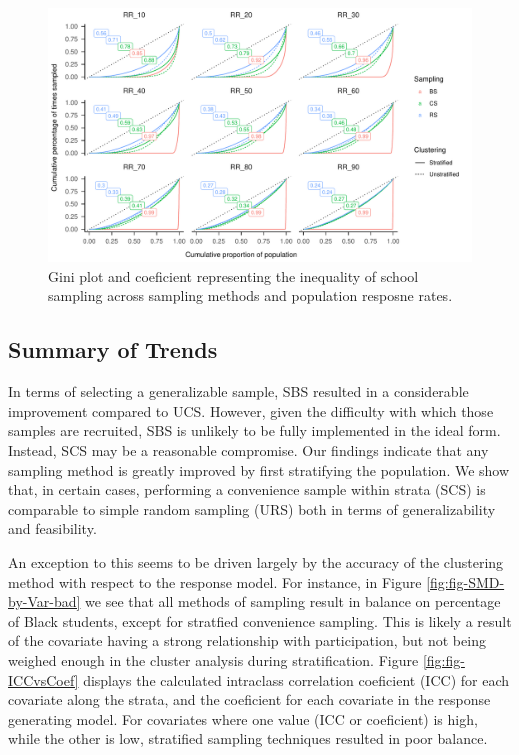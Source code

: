 \documentclass[man,floatsintext]{apa6}
\begin{document}
\begin{figure}
\includegraphics{GenSamp-Paper_files/figure-latex/fig-gini-curve-1} \caption{Gini plot and coeficient representing the inequality of school sampling across sampling methods and population resposne rates.}\label{fig:fig-gini-curve}
\end{figure}

\hypertarget{summary-of-trends}{%
\subsection{Summary of Trends}\label{summary-of-trends}}

In terms of selecting a generalizable sample, SBS resulted in a considerable improvement compared to UCS. However, given the difficulty with which those samples are recruited, SBS is unlikely to be fully implemented in the ideal form. Instead, SCS may be a reasonable compromise. Our findings indicate that any sampling method is greatly improved by first stratifying the population. We show that, in certain cases, performing a convenience sample within strata (SCS) is comparable to simple random sampling (URS) both in terms of generalizability and feasibility.

An exception to this seems to be driven largely by the accuracy of the clustering method with respect to the response model. For instance, in Figure \ref{fig:fig-SMD-by-Var-bad} we see that all methods of sampling result in balance on percentage of Black students, except for stratfied convenience sampling. This is likely a result of the covariate having a strong relationship with participation, but not being weighed enough in the cluster analysis during stratification. Figure \ref{fig:fig-ICCvsCoef} displays the calculated intraclass correlation coeficient (ICC) for each covariate along the strata, and the coeficient for each covariate in the response generating model. For covariates where one value (ICC or coeficient) is high, while the other is low, stratified sampling techniques resulted in poor balance.
\end{document}
